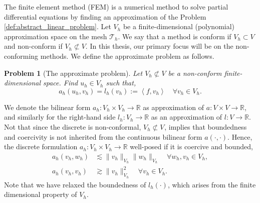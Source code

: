 \documentclass[11pt]{article}
\newtheorem{problem}[theorem]{Problem}
\theoremstyle{remark}
\numberwithin{equation}{section}
\begin{document}
The finite element method (FEM) is a numerical method to solve partial differential equations by finding an approximation of the Problem \ref{def:abstract_linear_problem}.  Let $V_{h}$ be a finite-dimensional (polynomial) approximation space on the mesh
$\mathcal{T} _{h}$. We say that a method is conform if $V_{h}\subset V $ and non-conform if $V _{h} \not\subset V$. In this thesis, our primary focus will be on the non-conforming methods. We define the approximate problem as follows.
\begin{problem}[The approximate problem]
    \label{def:approx_problem}
    Let $V_{h} \not\subset V$ be a non-conform finite-dimensional space. Find  $u_{h} \in V_{h}$ such that,
    \begin{equation}
        a_{h}(u_{h},v_{h} ) = l_{h}( v_{h}) :=  \left<f,v_{h} \right> \quad   \forall v_{h} \in V_{h}.
    \end{equation}
\end{problem}

We denote the bilinear form $a_{h}: V_{h} \times V_{h} \to \mathbb{R} $ as approximation of $a: V \times V \to \mathbb{R} $, and similarly for the right-hand side $l_{h} : V _{h} \to \mathbb{R} $ as an approximation of $l: V \to \mathbb{R} $.
Not that since the discrete is non-conformal, $V_{h} \not \subset  V_{}$, implies that boundedness and coercivity is not inherited from the continuous bilinear form $a( \cdot ,\cdot ) $. Hence, the discrete formulation $a_{h}:V_{h} \times V_{h}
\to \mathbb{R}  $ well-posed if it is coercive and bounded, \begin{equation}
    \begin{split}
   a_{h}( v_{h}, w_{h}) & \lesssim \| v_{h} \|_{ V_{h} }^{  } \| w_{h} \|_{ V_{h} }^{  } \quad    \forall w_{h},v_{h} \in V_{h},\\
   a_{h}( v_{h}, v_{h}) & \gtrsim  \| v_{h} \|_{ V_{h} }^{  2} \quad  \forall v_{h} \in V_{h}.
    \end{split}
\end{equation}
Note that we have relaxed the boundedness of $l_{h}( \cdot ) $, which arises from the finite dimensional property of $V_{h}$.
\end{document}
